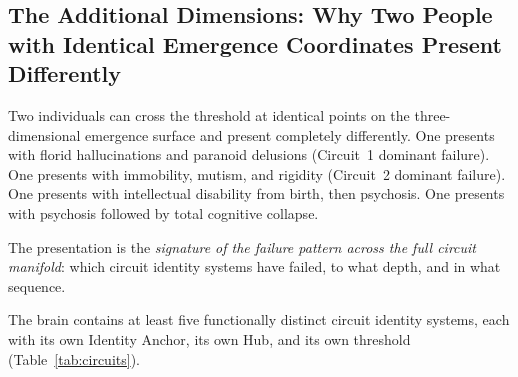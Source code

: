 \documentclass[12pt,a4paper]{article}
\begin{document}
\subsection{The Additional Dimensions: Why Two People with
Identical Emergence Coordinates Present Differently}

Two individuals can cross the threshold at identical points on
the three-dimensional emergence surface and present completely
differently. One presents with florid hallucinations and
paranoid delusions (Circuit~1 dominant failure). One presents
with immobility, mutism, and rigidity (Circuit~2 dominant
failure). One presents with intellectual disability from
birth, then psychosis. One presents with psychosis followed
by total cognitive collapse.

The presentation is the \emph{signature of the failure pattern
across the full circuit manifold}: which circuit identity
systems have failed, to what depth, and in what sequence.

The brain contains at least five functionally distinct circuit
identity systems, each with its own Identity Anchor, its own
Hub, and its own threshold (Table~\ref{tab:circuits}).
\end{document}
